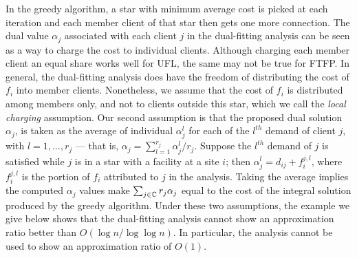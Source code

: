 \documentclass[oneside,final]{ucr}
\begin{document}
In the greedy algorithm, a star with minimum average cost is
picked at each iteration and each member client of that star
then gets one more connection. The dual value $\alpha_j$
associated with each client $j$ in the dual-fitting analysis
can be seen as a way to charge the cost to individual
clients. Although charging each member client an equal share
works well for UFL, the same may not be true for FTFP. In
general, the dual-fitting analysis does have the freedom of
distributing the cost of $f_i$ into member
clients. Nonetheless, we assume that the cost of $f_i$ is
distributed among members only, and not to clients outside
this star, which we call the \emph{local charging}
assumption. Our second assumption is that the proposed dual
solution $\alpha_j$, is taken as the average of individual
$\alpha_j^l$ for each of the $l^{th}$ demand of client $j$,
with $l=1,\ldots,r_j$ --- that is, $\alpha_j =
\sum_{l=1}^{r_j} \alpha_j^l / r_j$. Suppose the $l^{th}$
demand of $j$ is satisfied while $j$ is in a star with a
facility at a site $i$; then $\alpha_j^l = d_{ij} +
f_i^{j,l}$, where $f_i^{j,l}$ is the portion of $f_i$
attributed to $j$ in the analysis. Taking the average
implies the computed $\alpha_j$ values make
$\sum_{j\in\mathbb{C}} r_j \alpha_j$ equal to the cost of
the integral solution produced by the greedy
algorithm. Under these two assumptions, the example we give
below shows that the dual-fitting analysis cannot show an
approximation ratio better than $O(\log n / \log \log
n)$. In particular, the analysis cannot be used to show an
approximation ratio of $O(1)$.
\end{document}
